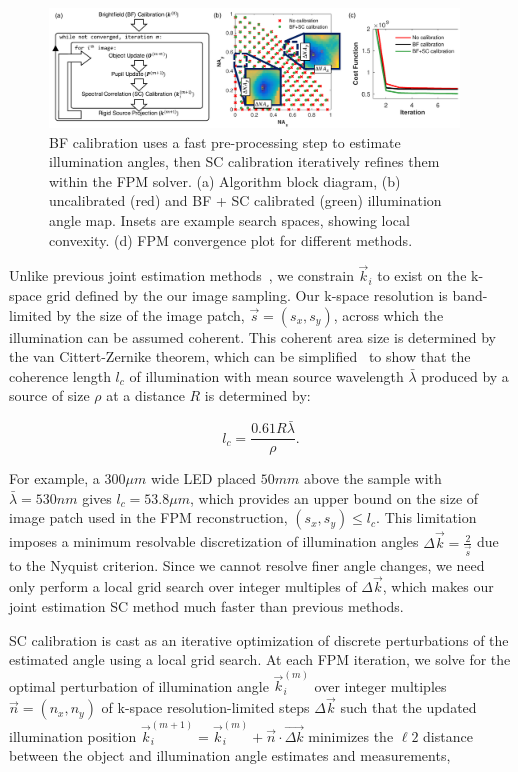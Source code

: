\begin{figure}[hbt]
	\centering
	\includegraphics[width=0.97\textwidth]{figures/fig_selfcal_fpm_df.pdf}
	\caption{BF calibration uses a fast pre-processing step to estimate illumination angles, then SC calibration iteratively refines them within the FPM solver. (a) Algorithm block diagram, (b) uncalibrated (red) and BF + SC calibrated (green) illumination angle map. Insets are example search spaces, showing local convexity. (d) FPM convergence plot for different methods.
		}
	\label{fig:DF_calibration}
\end{figure}

Unlike previous joint estimation methods~\cite{Yeh2015,Sun:16LEDpos}, we constrain $\vec{k}_i$ to exist on the k-space grid defined by the our image sampling. Our k-space resolution is band-limited by the size of the image patch, $\vec{s}=(s_x,s_y)$, across which the illumination can be assumed coherent. This coherent area size is determined by the van Cittert-Zernike theorem, which can be simplified~\cite{BornWolf} to show that the coherence length $l_c$ of illumination with mean source wavelength $\bar{\lambda}$ produced by a source of size $\rho$ at a distance $R$ is determined by:

\begin{equation}\label{eq:vancittert_zernike}
l_c = \frac{0.61 R \bar{\lambda}}{\rho}.
\end{equation}

\noindent For example, a $300\mu m$ wide LED placed $50 mm$ above the sample with $\bar{\lambda} = 530nm$ gives $l_c = 53.8\mu m$, which provides an upper bound on the size of image patch used in the FPM reconstruction, $(s_x,s_y) \leq l_c$. This limitation imposes a minimum resolvable discretization of illumination angles $\Delta{\vec{k}} = \frac{2}{\vec{s}}$ due to the Nyquist criterion. Since we cannot resolve finer angle changes, we need only perform a local grid search over integer multiples of $\Delta{\vec{k}}$, which makes our joint estimation SC method much faster than previous methods.

SC calibration is cast as an iterative optimization of discrete perturbations of the estimated angle using a local grid search. At each FPM iteration, we solve for the optimal perturbation of illumination angle  $\vec{{k}}_i^{(m)}$ over integer multiples $\vec{n} = (n_x, n_y)$ of k-space resolution-limited steps $\Delta \vec{k}$ such that the updated illumination position $\vec{k}_i^{(m+1)} = \vec{{k}}_i^{(m)} + \vec{n} \cdot \vec{\Delta {k}}$ minimizes the $\ell 2$ distance between the object and illumination angle estimates and measurements,

